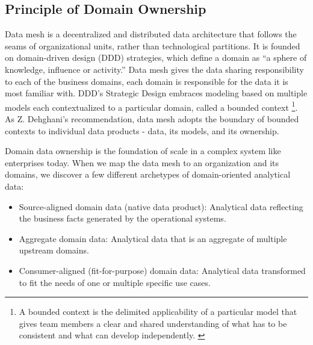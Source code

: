 \documentclass[12pt, a4paper]{book}
\begin{document}
\subsection{Principle of Domain Ownership}
Data mesh is a decentralized and distributed data architecture that follows the seams of organizational units, rather than technological partitions. It is founded on domain-driven design (DDD) strategies, which define a domain as “a sphere of knowledge, influence or activity.” Data mesh gives the data sharing responsibility to each of the business domains, each domain is responsible for the data it is most familiar with. DDD’s Strategic Design embraces modeling based on multiple models each contextualized to a particular domain, called a bounded context \footnote{A bounded context is the delimited applicability of a particular model that gives team members a clear and shared understanding of what has to be consistent and what can develop independently. \cite{dddevan}}. As Z. Dehghani’s recommendation, data mesh adopts the boundary of bounded contexts to individual data products - data, its models, and its ownership.

Domain data ownership is the foundation of scale in a complex system like enterprises today. When we map the data mesh to an organization and its domains, we discover a few different archetypes of domain-oriented analytical data:
	\begin{itemize}[nosep]
		\item Source-aligned domain data (native data product): Analytical data reflecting the business facts generated by the operational systems.
		\item Aggregate domain data: Analytical data that is an aggregate of multiple upstream domains.
		\item Consumer-aligned (fit-for-purpose) domain data: Analytical data transformed to fit the needs of one or multiple specific use cases.
	\end{itemize}
\end{document}

